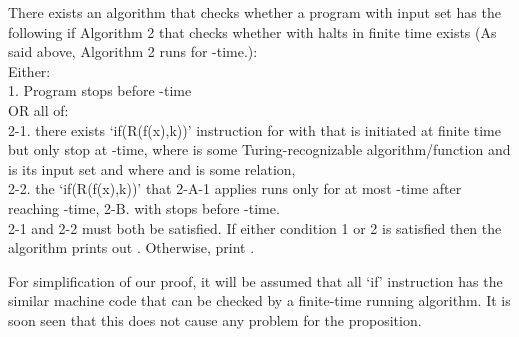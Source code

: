 \documentclass{roffin}
\begin{document}
\begin{proposition}
There exists an algorithm that checks whether a program  with input set  has the following if Algorithm 2 that checks whether  with  halts in finite time exists (As said above, Algorithm 2 runs for -time.):\\
Either:\\
1. Program stops before -time\\
OR all of:\\
2-1. there exists `if(R(f(x),k))' instruction for  with  that is initiated at finite time but only stop at -time, where  is some Turing-recognizable algorithm/function and  is its input set and  where  and  is some relation,\\
2-2. the `if(R(f(x),k))' that 2-A-1 applies runs only for at most -time after reaching -time, 
2-B.  with  stops before -time.\\
2-1 and 2-2 must both be satisfied. If either condition 1 or 2 is satisfied then the algorithm prints out . Otherwise, print .     
\end{proposition}
For simplification of our proof, it will be assumed that all `if' instruction has the similar machine code that can be checked by a finite-time running algorithm. It is soon seen that this does not cause any problem for the proposition.
\end{document}
